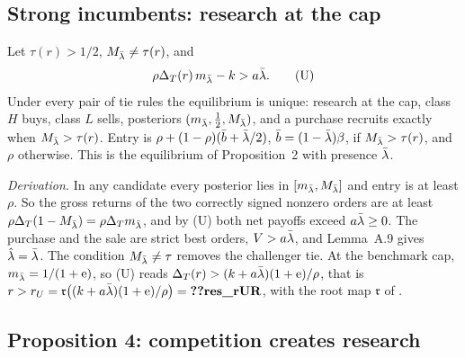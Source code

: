 \subsection{Strong incumbents: research at the cap}\label{sec:09_research-strong}

\begin{resultbox}
Let \(\tau(r)>1/2\), \(M_{\bar\lambda}\ne\tau(r)\), and
\begin{equation*}
\rho\Delta_T(r)\,m_{\bar\lambda}-k>a\bar\lambda .\tag*{(U)}
\end{equation*}
Under every pair of tie rules the equilibrium is unique: research at the cap, class \(H\) buys, class \(L\) sells,
posteriors \((m_{\bar\lambda},\tfrac12,M_{\bar\lambda})\), and a purchase recruits exactly when \(M_{\bar\lambda}>\tau(r)\). Entry is
\(\rho+(1-\rho)(\bar b+\bar\lambda/2)\), \(\bar b=(1-\bar\lambda)\beta\), if \(M_{\bar\lambda}>\tau(r)\), and \(\rho\) otherwise. This is the
equilibrium of Proposition~2 with presence \(\bar\lambda\).
\end{resultbox}
\emph{Derivation.} In any candidate every posterior lies in \([m_{\bar\lambda},M_{\bar\lambda}]\) and entry is at least \(\rho\). So the gross
returns of the two correctly signed nonzero orders are at least \(\rho\Delta_T(1-M_{\bar\lambda})=\rho\Delta_T m_{\bar\lambda}\), and by (U) both
net payoffs exceed \(a\bar\lambda\ge0\). The purchase and the sale are strict best orders, \(V>a\bar\lambda\), and Lemma~A.9 gives
\(\hat\lambda=\bar\lambda\). The condition \(M_{\bar\lambda}\ne\tau\) removes the challenger tie. At the benchmark cap, \(m_{\bar\lambda}=1/(1+\mathrm{e})\),
so (U) reads \(\Delta_T(r)>(k+a\bar\lambda)(1+\mathrm{e})/\rho\), that is \(r>r_U=\mathfrak r\bigl((k+a\lb)(1+\eu)/\rho\bigr)=\reg{res_rUR}\), with
the root map \(\mathfrak r\) of .

\subsection{Proposition 4: competition creates research}\label{sec:09_research-prop4}

